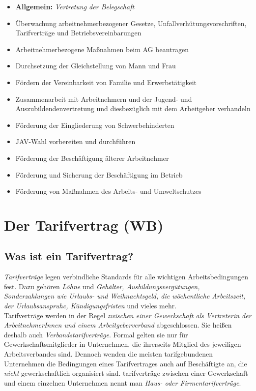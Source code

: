 \documentclass[a4paper, 12pt]{report}
\begin{document}
\begin{itemize}
    \item \textbf{Allgemein:} \emph{Vertretung der Belegschaft}
    \item Überwachung arbeitnehmerbezogener Gesetze,
	Unfallverhütungsvorschriften, Tarifverträge und Betriebsvereinbarungen
    \item Arbeitnehmerbezogene Maßnahmen beim AG beantragen
    \item Durchsetzung der Gleichstellung von Mann und Frau
    \item Fördern der Vereinbarkeit von Familie und Erwerbstätigkeit
    \item Zusammenarbeit mit Arbeitnehmern und der Jugend- und
	Auszubildendenvertretung und diesbezüglich mit dem Arbeitgeber
	verhandeln
    \item Förderung der Eingliederung von Schwerbehinderten
    \item JAV-Wahl vorbereiten und durchführen
    \item Förderung der Beschäftigung älterer Arbeitnehmer
    \item Förderung und Sicherung der Beschäftigung im Betrieb
    \item Förderung von Maßnahmen des Arbeits- und Umweltschutzes
\end{itemize}

\section{Der Tarifvertrag (WB)}

\subsection{Was ist ein Tarifvertrag?}

\emph{Tarifverträge} legen verbindliche Standards für alle wichtigen
Arbeitsbedingungen fest. Dazu gehören \emph{Löhne} und \emph{Gehälter,
Ausbildungsvergütungen, Sonderzahlungen wie Urlaubs- und Weihnachtsgeld, die
wöchentliche Arbeitszeit, der Urlaubsanspruhc, Kündigungsfristen} und vieles
mehr. \\

Tarifverträge werden in der Regel \emph{zwischen einer Gewerkschaft als
Vertreterin der ArbeitnehmerInnen und einem Arbeitgeberverband} abgeschlossen.
Sie heißen deshalb auch \emph{Verbandstarifverträge}. Formal gelten sie nur für
Gewerkschaftsmitglieder in Unternehmen, die ihrerseits Mitglied des jeweiligen
Arbeitsverbandes sind. Dennoch wenden die meisten tarifgebundenen Unternehmen
die Bedingungen eines Tarifvertrages auch auf Beschäftigte an, die \emph{nicht}
gewerkschaftlich organisiert sind. tarifverträge zwischen einer Gewerkschaft und
einem einzelnen Unternehmen nennt man \emph{Haus- oder Firmentarifverträge}. \\
\end{document}

